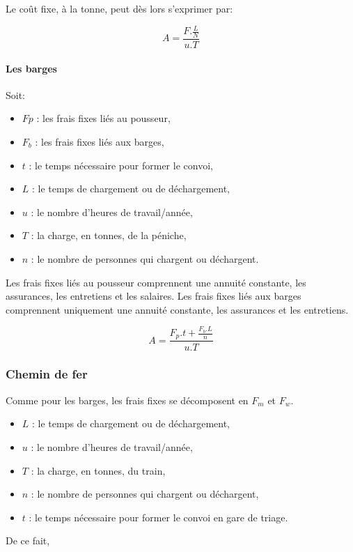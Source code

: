 Le coût fixe, à la tonne, peut dès lors s'exprimer par:

$$A=\frac{F.\frac{L}{N}}{u.T}$$

\paragraph{Les barges}

Soit:

\begin{itemize}
\item $Fp$ : les frais fixes liés au pousseur,
\item $F_b$ : les frais fixes liés aux barges,
\item $t$ : le temps nécessaire pour former le convoi,
\item $L$ : le temps de chargement ou de déchargement,
\item $u$ : le nombre d'heures de travail/année,
\item $T$ : la charge, en tonnes, de la péniche,
\item $n$ : le nombre de personnes qui chargent ou déchargent.
\end{itemize}

Les frais fixes liés au pousseur comprennent une annuité constante,
les assurances, les entretiens et les salaires. Les frais fixes
liés aux barges comprennent uniquement une annuité constante, les
assurances et les entretiens.

$$A=\frac{F_p.t+\frac{F_b.L}{n}}{u.T}$$

\subsubsection{Chemin de fer}

Comme pour les barges, les frais fixes se décomposent en $F_m$ et
$F_w$.

\begin{itemize}
\item $L$ : le temps de chargement ou de déchargement,
\item $u$ : le nombre d'heures de travail/année,
\item $T$ : la charge, en tonnes, du train,
\item $n$ : le nombre de personnes qui chargent ou déchargent,
\item $t$ : le temps nécessaire pour former le convoi en gare de triage.
\end{itemize}

De ce fait,

